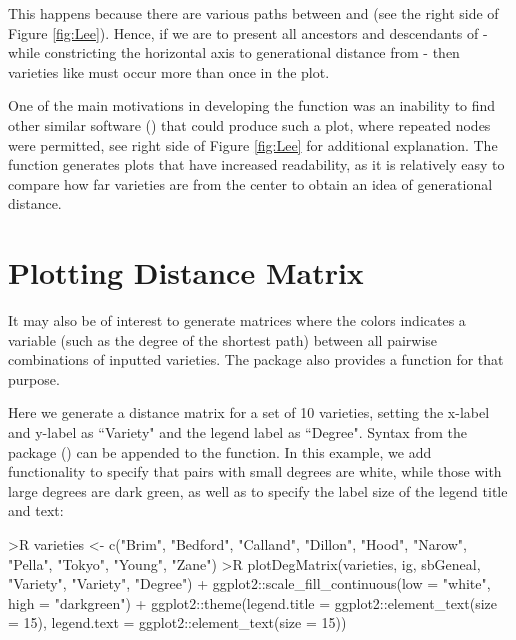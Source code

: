 \documentclass[article,shortnames]{jss}
\begin{document}
This happens because there are various paths between  and  (see the right side of Figure \ref{fig:Lee}). Hence, if we are to present all ancestors and descendants of  - while constricting the horizontal axis to generational distance from  - then varieties like  must occur more than once in the plot.

One of the main motivations in developing the  function was an inability to find other similar software (\citealt{ape}) that could produce such a plot, where repeated nodes were permitted, see right side of Figure \ref{fig:Lee} for additional explanation. The  function generates plots that have increased readability, as it is relatively easy to compare how far varieties are from the center to obtain an idea of generational distance.

\section{Plotting Distance Matrix}

It may also be of interest to generate matrices where the colors indicates a variable (such as the degree of the shortest path) between all pairwise combinations of inputted varieties. The package  also provides a function  for that purpose.

Here we generate a distance matrix for a set of 10 varieties, setting the x-label and y-label as ``Variety" and the legend label as ``Degree". Syntax from the  package (\citealt{ggplot2}) can be appended to the  function. In this example, we add  functionality to specify that pairs with small degrees are white, while those with large degrees are dark green, as well as to specify the label size of the legend title and text:

\begin{Code}
>R varieties <- c("Brim", "Bedford", "Calland", "Dillon", "Hood", "Narow",
  "Pella", "Tokyo", "Young", "Zane")
>R plotDegMatrix(varieties, ig, sbGeneal, "Variety", "Variety", "Degree") +
  ggplot2::scale_fill_continuous(low = "white", high = "darkgreen") +
  ggplot2::theme(legend.title = ggplot2::element_text(size = 15),
  legend.text = ggplot2::element_text(size = 15))
\end{Code}
\end{document}
